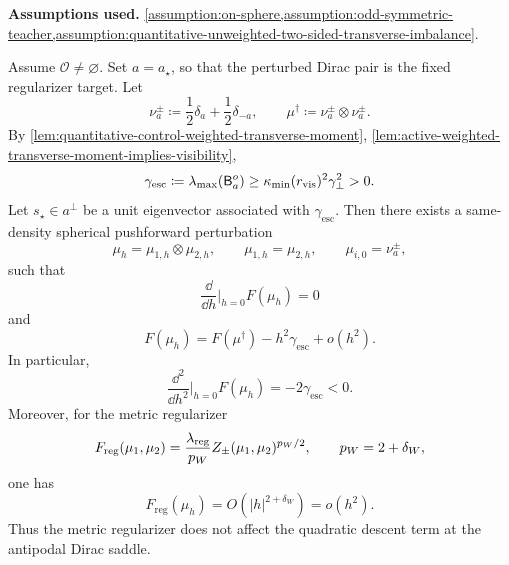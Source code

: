 \begin{proposition}
\label{lemma:descent-direction-antipodal-dirac-from-unweighted-imbalance}
\textbf{Assumptions used.}
\cref{assumption:on-sphere,assumption:odd-symmetric-teacher,assumption:quantitative-unweighted-two-sided-transverse-imbalance}.

Assume \(\mathcal O\ne\varnothing\).  Set \(a=a_\star\), so that the
perturbed Dirac pair is the fixed regularizer target.  Let
\[
    \nu_a^\pm
    \coloneq
    \frac12\delta_a+\frac12\delta_{-a},
    \qquad
    \mu^\dagger
    \coloneq
    \nu_a^\pm\otimes\nu_a^\pm.
\]
By                                                                      
\cref{lem:quantitative-control-weighted-transverse-moment},
\cref{lem:active-weighted-transverse-moment-implies-visibility},
\[
    \gamma_{\mathrm{esc}}
    \coloneq
    \lambda_{\max}(\mathsf B_a^o)
    \ge
    \kappa_{\min}(r_{\rm vis})^2\gamma_{\perp}^2
    >0.
\]
Let \(s_\star\in a^\perp\) be a unit eigenvector associated with
\(\gamma_{\mathrm{esc}}\).
Then there exists a same-density spherical
pushforward perturbation
\[
    \mu_h=\mu_{1,h}\otimes\mu_{2,h},
    \qquad
    \mu_{1,h}=\mu_{2,h},
    \qquad
    \mu_{i,0}=\nu_a^\pm,
\]
such that
\[
    \frac{\dd}{\dd h}\Big|_{h=0}F(\mu_h)=0
\]
and
\[
    F(\mu_h)
    =
    F(\mu^\dagger)
    -
    h^2\gamma_{\mathrm{esc}}
    +
    o(h^2).
\]
In particular,
\[
    \frac{\dd^2}{\dd h^2}\Big|_{h=0}F(\mu_h)
    =
    -2\gamma_{\mathrm{esc}}<0.
\]
Moreover, for the metric regularizer
\[
    F_{\mathrm{reg}}(\mu_1,\mu_2)
    =
    \frac{\lambda_{\mathrm{reg}}}{p_W}
    Z_\pm(\mu_1,\mu_2)^{p_W/2},
    \qquad
    p_W=2+\delta_W,
\]
one has
\[
    F_{\mathrm{reg}}(\mu_h)=O(|h|^{2+\delta_W})=o(h^2).
\]
Thus the metric regularizer does not affect the quadratic descent term at
the antipodal Dirac saddle.
\end{proposition}

